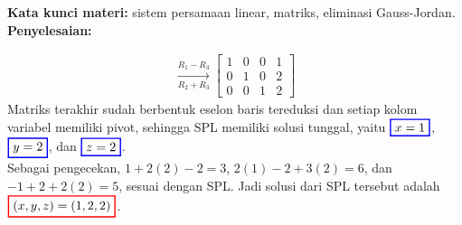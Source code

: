 \documentclass[10pt,openany,a4paper]{article}
\theoremstyle{definition}
\theoremstyle{definition}
\theoremstyle{plain}
\newenvironment{jawab}[2][tes]{%
\par\noindent\textbf{Kata kunci materi:} #1.\\
\textbf{Penyelesaian:} #2%
}{}
\begin{document}
\begin{enumerate}
\begin{jawab}[sistem persamaan linear, matriks, eliminasi Gauss-Jordan]
{\begin{enumerate}
\begin{align*}
                \xrightarrow[R_2 + R_3]{R_1 - R_3}
                \left[\begin{array}{ccc|c}
                    1 & 0 & 0 & 1\\
                    0 & 1 & 0 & 2\\
                    0 & 0 & 1 & 2
                \end{array}\right]
            \end{align*}
            Matriks terakhir sudah berbentuk eselon baris tereduksi dan setiap kolom variabel memiliki pivot, sehingga SPL memiliki solusi tunggal, yaitu $\colorlet{oldcolor}{.}
        \color{blue}
        \setlength{\fboxrule}{1pt} \boxed{\color{oldcolor}x=1}\color{oldcolor}$, $\colorlet{oldcolor}{.}
        \color{blue}
        \setlength{\fboxrule}{1pt} \boxed{\color{oldcolor}y=2}\color{oldcolor}$, dan $\colorlet{oldcolor}{.}
        \color{blue}
        \setlength{\fboxrule}{1pt} \boxed{\color{oldcolor}z=2}\color{oldcolor}$.\\
            Sebagai pengecekan, $1+2(2)-2=3$, $2(1)-2+3(2)=6$, dan $-1+2+2(2)=5$, sesuai dengan SPL. Jadi solusi dari SPL tersebut adalah $\colorlet{oldcolor}{.}
        \color{red}
        \setlength{\fboxrule}{1pt} \boxed{\color{oldcolor}(x,y,z)=(1,2,2)}\color{oldcolor}$.
        \end{enumerate}
    }
    \end{jawab}


\end{enumerate}
\end{document}
